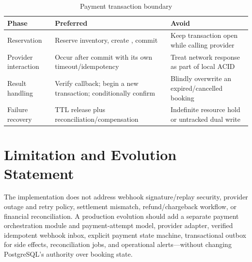 \begin{table}[H]
\centering
\caption{Payment transaction boundary}
\begin{tabularx}{\textwidth}{p{}YY}
\toprule
\textbf{Phase} & \textbf{Preferred} & \textbf{Avoid} \\
\midrule
Reservation & Reserve inventory, create , commit & Keep transaction open while calling provider \\
Provider interaction & Occur after commit with its own timeout/idempotency & Treat network response as part of local ACID \\
Result handling & Verify callback; begin a new transaction; conditionally confirm & Blindly overwrite an expired/cancelled booking \\
Failure recovery & TTL release plus reconciliation/compensation & Indefinite resource hold or untracked dual write \\
\bottomrule
\end{tabularx}
\end{table}

\section{Limitation and Evolution Statement}
The implementation does not address webhook signature/replay security,
provider outage and retry policy, settlement mismatch, refund/chargeback
workflow, or financial reconciliation. A production evolution should add a
separate payment orchestration module and payment-attempt model, provider
adapter, verified idempotent webhook inbox, explicit payment state machine,
transactional outbox for side effects, reconciliation jobs, and operational
alerts---without changing PostgreSQL's authority over booking state.
